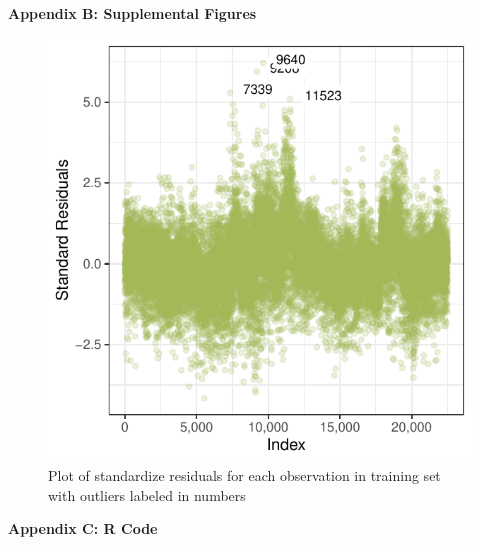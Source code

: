 \documentclass[11pt]{article}\usepackage[]{graphicx}\usepackage[]{color}
\makeatletter
\def\maxwidth{ %
  \ifdim\Gin@nat@width>\linewidth
    \linewidth
  \else
    \Gin@nat@width
  \fi
}
\makeatother
\begin{document}
\clearpage
\newpage
\noindent \Large{{\bf Appendix B: Supplemental Figures}}

\begin{figure}[h!] 
\begin{center}

\includegraphics[width=\maxwidth]{figure/unnamed-chunk-10-1} 

\caption{Plot of standardize residuals for each observation in training set with outliers labeled in numbers}
\label{diag3}
\end{center} 
\end{figure}


\clearpage
\newpage
\noindent \Large{{\bf Appendix C: R Code}}

\end{document}
